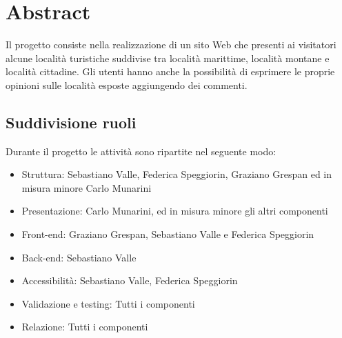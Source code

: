 \section{Abstract}
Il progetto consiste nella realizzazione di un sito Web che presenti ai
visitatori alcune località turistiche suddivise tra località marittime,
località montane e località cittadine.
Gli utenti hanno anche la possibilità di esprimere le proprie opinioni sulle
località esposte aggiungendo dei commenti.

\subsection{Suddivisione ruoli}
Durante il progetto le attività sono ripartite nel seguente modo:
\begin{itemize}
\item Struttura: Sebastiano Valle, Federica Speggiorin, Graziano Grespan ed in misura minore Carlo Munarini
\item Presentazione: Carlo Munarini, ed in misura minore gli altri componenti
\item Front-end: Graziano Grespan, Sebastiano Valle e Federica Speggiorin
\item Back-end: Sebastiano Valle
\item Accessibilità: Sebastiano Valle, Federica Speggiorin
\item Validazione e testing: Tutti i componenti
\item Relazione: Tutti i componenti
\end{itemize}